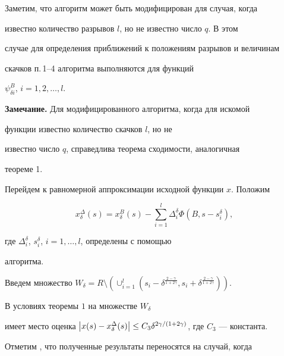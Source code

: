 Заметим, что алгоритм может быть модифицирован для случая, когда


известно количество разрывов $l$, но не известно число $q$. В этом


случае для определения приближений к положениям разрывов и величинам


скачков п.\,1--4 алгоритма выполняются для функций


$\psi^B_{\delta i}$, $i=1,2,\dotsc,l$.


\medskip





{\bf Замечание.} Для модифицированного алгоритма, когда для искомой


функции известно количество скачков $l$, но не


известно число $q$, справедлива теорема сходимости, аналогичная


теореме 1.


\medskip





Перейдем к равномерной аппроксимации исходной функции $x$. Положим


$$


x_\delta^\Delta (s)=x_\delta^B(s)-\sum_{i=1}^l\Delta_i^\delta\Phi


(B,s-s_i^\delta),


$$


где $\Delta_i^\delta$, $s_i^\delta$, $i=1,\dotsc,l$, определены с помощью


алгоритма.


Введем множество $W_{\delta}=R\setminus


(\cup_{i=1}^l (s_i-\delta^{\frac{2-\gamma}{1+2\gamma}},


s_i+\delta^{\frac{2-\gamma}{1+2\gamma}}))$.





\begin{thm}


В условиях теоремы $1$ на множестве $W_{\delta}$


имеет место оценка $\Mod{x(s)-x_\delta^\Delta


(s)}\leq C_3\delta^{2\gamma/(1+2\gamma)}$, где $C_3$ --- константа.


\end{thm}





Отметим \cite{2}, что полученные результаты переносятся на случай, когда



